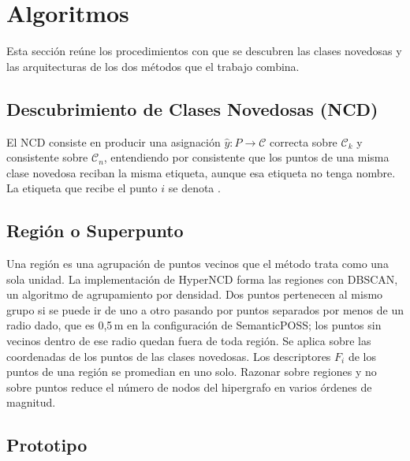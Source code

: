 \section{Algoritmos}
\label{sec:algoritmos}

Esta sección reúne los procedimientos con que se descubren las clases
novedosas y las arquitecturas de los dos métodos que el trabajo combina.

\subsection{Descubrimiento de Clases Novedosas (NCD)}
\label{sec:ncd}

El NCD consiste en producir una asignación $\hat{y}:P\rightarrow\mathcal{C}$
correcta sobre $\mathcal{C}_k$ y consistente sobre $\mathcal{C}_n$, entendiendo
por consistente que los puntos de una misma clase novedosa reciban la misma
etiqueta, aunque esa etiqueta no tenga nombre. La etiqueta que recibe el punto
$i$ se denota . 

\subsection{Región o Superpunto}
\label{sec:region}

Una región es una agrupación de puntos vecinos que el método trata como una
sola unidad.
La implementación de HyperNCD forma las regiones con
DBSCAN, un algoritmo de agrupamiento por densidad. Dos puntos pertenecen al
mismo grupo si se puede ir de uno a otro pasando por puntos separados por menos
de un radio dado, que es 0{,}5\,m en la configuración de SemanticPOSS; los
puntos sin vecinos dentro de ese radio quedan fuera de toda región. Se aplica sobre las coordenadas de los puntos de las clases novedosas. Los descriptores $F_i$ de los puntos de una región se promedian en uno solo.
Razonar sobre regiones y no sobre puntos reduce el
número de nodos del hipergrafo en varios órdenes de magnitud.

\subsection{Prototipo}
\label{sec:prototipo}
\label{sec:formproto}


